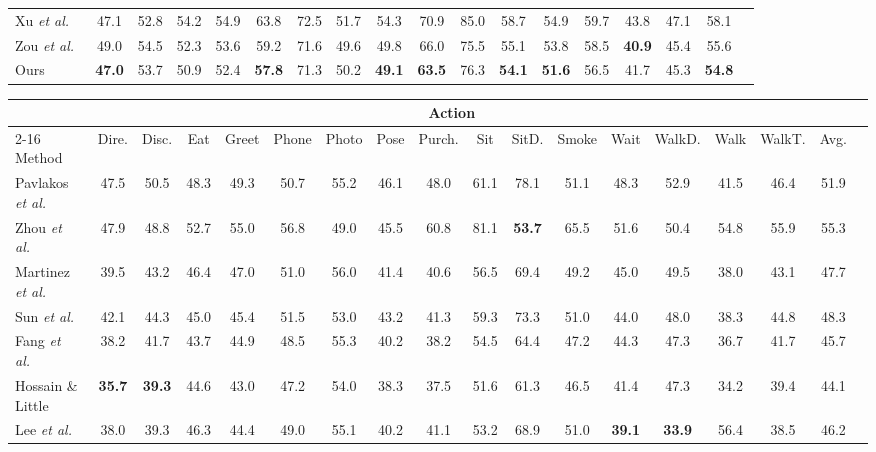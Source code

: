 \documentclass{bmvc2k}
\begin{document}
\begin{table*}[!htb]
\begin{tabular}{l*{17}{c}}
Xu \textit{et al.}~\cite{YuanluXu:2021} & 47.1 & 52.8 & 54.2 & 54.9 & 63.8 & 72.5 & 51.7 & 54.3 & 70.9 & 85.0 & 58.7 & 54.9 & 59.7 & 43.8 & 47.1 & 58.1\\
Zou \textit{et al.}~\cite{zou2020high} & 49.0& 54.5& 52.3& 53.6& 59.2 &71.6& 49.6& 49.8 &66.0 &75.5 &55.1 &53.8& 58.5& \textbf{40.9}& 45.4 &55.6\\
\midrule
Ours &\textbf{47.0} & 53.7 & 50.9 & 52.4&\textbf{57.8} &71.3&50.2 &\textbf{49.1} &\textbf{63.5} &76.3  &\textbf{54.1}&\textbf{51.6} &56.5 &41.7 &45.3 &\textbf{54.8} \\
\bottomrule
\end{tabular}
\label{Tab:Result1}
\end{table*}

\begin{table*}[!htb]
\caption{Performance comparison of our model and baseline methods using PA-MPJPE between the ground truth and estimated pose on Human3.6M under Protocol \#2.}
\footnotesize
\setlength{\tabcolsep}{.4pt}
\medskip
\centering
\begin{tabular}{l*{17}{c}}
\toprule
& \multicolumn{15}{c}{Action}\\
\cmidrule(lr){2-16}
Method & Dire. & Disc. &  Eat & Greet & Phone & Photo &  Pose & Purch. & Sit & SitD. & Smoke & Wait & WalkD. & Walk & WalkT. & Avg.\\
\midrule
Pavlakos \textit{et al.}~\cite{pavlakos2017coarse} & 47.5 &50.5 &48.3& 49.3& 50.7 &55.2 &46.1 &48.0& 61.1& 78.1 &51.1& 48.3& 52.9& 41.5& 46.4 &51.9 \\
Zhou \textit{et al.}~\cite{zhou2017towards} & 47.9& 48.8 &52.7& 55.0& 56.8& 49.0 &45.5 &60.8& 81.1 &\textbf{53.7}& 65.5& 51.6& 50.4 &54.8 &55.9& 55.3\\
Martinez \textit{et al.}~\cite{martinez2017simple} & 39.5 &43.2 &46.4 &47.0 &51.0& 56.0 &41.4& 40.6 &56.5& 69.4& 49.2& 45.0& 49.5& 38.0 &43.1 &47.7\\
Sun \textit{et al.}~\cite{sun2017compositional} & 42.1& 44.3& 45.0 &45.4 &51.5 &53.0 &43.2& 41.3& 59.3 &73.3& 51.0& 44.0& 48.0& 38.3& 44.8& 48.3\\
Fang \textit{et al.}~\cite{fang2018learning} & 38.2& 41.7& 43.7& 44.9& 48.5 &55.3& 40.2& 38.2& 54.5 &64.4& 47.2 &44.3& 47.3& 36.7& 41.7& 45.7\\
Hossain \& Little~\cite{rayat2018exploiting}  & \textbf{35.7} &\textbf{39.3}& 44.6 &43.0& 47.2& 54.0& 38.3 &37.5 &51.6 &61.3& 46.5& 41.4 &47.3 &34.2 &39.4& 44.1\\
Lee \textit{et al.}~\cite{Lee2018LSTM}  & 38.0 & 39.3 & 46.3 & 44.4 & 49.0 & 55.1 & 40.2 & 41.1 & 53.2 & 68.9 & 51.0 & \textbf{39.1} & \textbf{33.9} & 56.4 & 38.5 & 46.2 \\

\end{tabular}
\end{table*}
\end{document}
